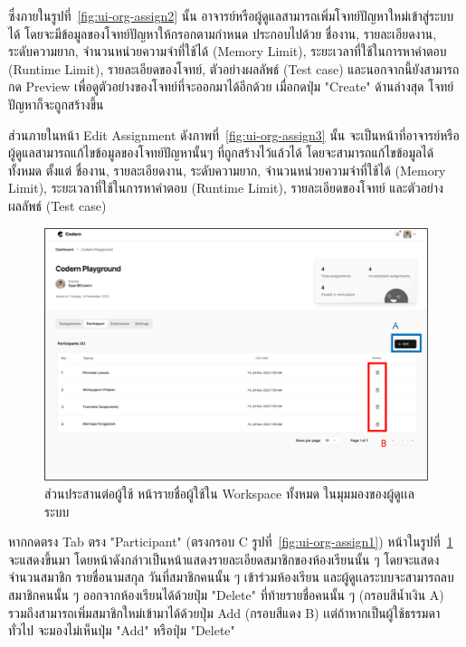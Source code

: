 \documentclass[12pt,oneside,openright,a4paper]{cpe-thai-project}
\begin{document}
    \begin{flushleft}
    ซึ่งภายในรูปที่~\ref{fig:ui-org-assign2} นั้น อาจารย์หรือผู้ดูแลสามารถเพิ่มโจทย์ปัญหาใหม่เข้าสู่ระบบได้ โดยจะมีข้อมูลของโจทย์ปัญหาให้กรอกตามกำหนด ประกอบไปด้วย ชื่องาน, รายละเอียดงาน, ระดับความยาก, จำนวนหน่วยความจำที่ใช้ได้ (Memory Limit), ระยะเวลาที่ใช้ในการหาคำตอบ (Runtime Limit), รายละเอียดของโจทย์, ตัวอย่างผลลัพธ์ (Test case) และนอกจากนี้ยังสามารถกด Preview เพื่อดูตัวอย่างของโจทย์ที่จะออกมาได้อีกด้วย เมื่อกดปุ่ม "Create" ด้านล่างสุด โจทย์ปัญหาก็จะถูกสร้างขึ้น
    \end{flushleft}
    \begin{flushleft}
    ส่วนภายในหน้า Edit Assignment ดังภาพที่~\ref{fig:ui-org-assign3} นั้น จะเป็นหน้าที่อาจารย์หรือผู้ดูแลสามารถแก้ไขข้อมูลของโจทย์ปัญหานั้นๆ ที่ถูกสร้างไว้แล้วได้ โดยจะสามารถแก้ไขข้อมูลได้ทั้งหมด ตั้งแต่ ชื่องาน, รายละเอียดงาน, ระดับความยาก, จำนวนหน่วยความจำที่ใช้ได้ (Memory Limit), ระยะเวลาที่ใช้ในการหาคำตอบ (Runtime Limit), รายละเอียดของโจทย์ และตัวอย่างผลลัพธ์ (Test case)
    \end{flushleft}

    \hypertarget{ui-org-assign4}{
        \begin{figure}[H]
        \centering
            \includegraphics[width=15cm]{figure/ui/ui-assign6.png}
            \caption[ส่วนประสานต่อผู้ใช้ หน้ารายชื่อผู้ใช้ใน Workspace ของผู้ดูเเลระบบ]{ส่วนประสานต่อผู้ใช้ หน้ารายชื่อผู้ใช้ใน Workspace ทั้งหมด ในมุมมองของผู้ดูเเลระบบ}
            \label{fig:ui-org-assign4}
        \end{figure}
    }
    \begin{flushleft}
    หากกดตรง Tab ตรง "Participant" (ตรงกรอบ C รูปที่~\ref{fig:ui-org-assign1}) หน้าในรูปที่~\ref{fig:ui-org-assign4} จะแสดงขึ้นมา โดยหน้าดังกล่าวเป็นหน้าแสดงรายละเอียดสมาชิกของห้องเรียนนั้น ๆ โดยจะแสดงจำนวนสมาชิก รายชื่อนามสกุล วันที่สมาชิกคนนั้น ๆ เข้าร่วมห้องเรียน และผู้ดูเเลระบบจะสามารถลบสมาชิกคนนั้น ๆ ออกจากห้องเรียนได้ด้วยปุ่ม "Delete" ที่ท้ายรายชื่อคนนั้น ๆ (กรอบสีน้ำเงิน A) รวมถึงสามารถเพิ่มสมาชิกใหม่เข้ามาได้ด้วยปุ่ม Add (กรอบสีแดง B) เเต่ถ้าหากเป็นผู้ใช้ธรรมดาทั่วไป จะมองไม่เห็นปุ่ม "Add" หรือปุ่ม "Delete"
    \end{flushleft}
    \pagebreak
\end{document}
